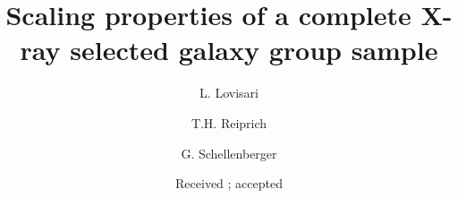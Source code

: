 \documentclass{aa} %
\begin{document}
%
\title{Scaling properties of a complete X-ray selected galaxy group sample }
\author{L. Lovisari \and T.H. Reiprich \and G. Schellenberger
}


\date{Received ; accepted }

 
\end{document}
